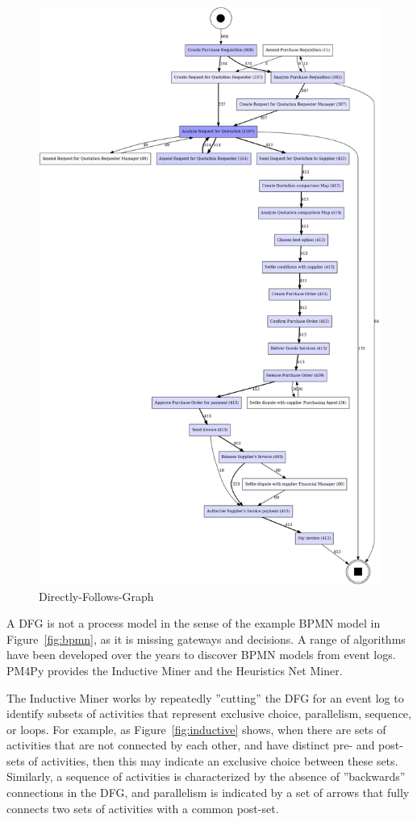 \begin{figure}
\centering
\includegraphics[width=.9\textwidth]{dfg.png}
\caption{Directly-Follows-Graph}
\label{fig:dfg}
\end{figure}

A DFG is not a process model in the sense of the example BPMN model in Figure~\ref{fig:bpmn}, as it is missing gateways and decisions. A range of algorithms have been developed over the years to discover BPMN models from event logs. PM4Py provides the Inductive Miner and the Heuristics Net Miner. 

The Inductive Miner works by repeatedly ''cutting'' the DFG for an event log to identify subsets of activities that represent exclusive choice, parallelism, sequence, or loops. For example, as Figure~\ref{fig:inductive} shows, when there are sets of activities that are not connected by each other, and have distinct pre- and post-sets of activities, then this may indicate an exclusive choice between these sets. Similarly, a sequence of activities is characterized by the absence of ''backwards'' connections in the DFG, and parallelism is indicated by a set of arrows that fully connects two sets of activities with a common post-set. 

